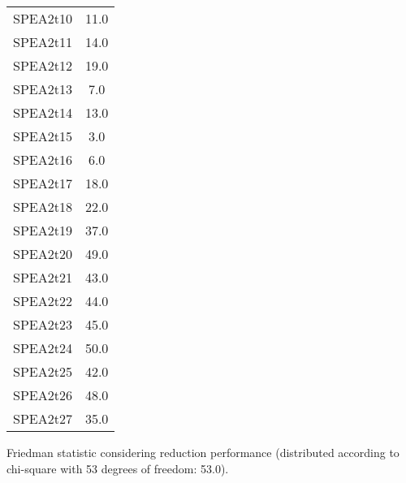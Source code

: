 \documentclass{article}
\begin{document}
\begin{table}[!htp]
\begin{tabular}{c|c}
SPEA2t10&11.0\\
SPEA2t11&14.0\\
SPEA2t12&19.0\\
SPEA2t13&7.0\\
SPEA2t14&13.0\\
SPEA2t15&3.0\\
SPEA2t16&6.0\\
SPEA2t17&18.0\\
SPEA2t18&22.0\\
SPEA2t19&37.0\\
SPEA2t20&49.0\\
SPEA2t21&43.0\\
SPEA2t22&44.0\\
SPEA2t23&45.0\\
SPEA2t24&50.0\\
SPEA2t25&42.0\\
SPEA2t26&48.0\\
SPEA2t27&35.0\\
\end{tabular}
\end{table}


Friedman statistic considering reduction performance (distributed according to chi-square with 53 degrees of freedom: 53.0).
\end{document}

